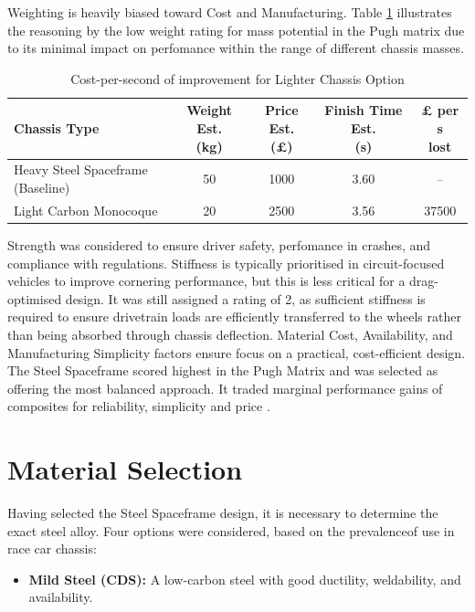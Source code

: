 \documentclass[11pt, a4paper]{report}
\numberwithin{equation}{section}
\begin{document}
\begin{refsection}
Weighting is heavily biased toward Cost and Manufacturing. Table \ref{tab:chassis_cost_performance} illustrates the reasoning by the low weight rating for mass potential in the Pugh matrix due to its minimal impact on perfomance within the range of different chassis masses.

\begin{table}[h]
\centering
\caption{Cost-per-second of improvement for Lighter Chassis Option}
\label{tab:chassis_cost_performance}
\begin{tabular}{|l|c|c|c|c|}
\hline
\textbf{Chassis Type} & \makecell{\textbf{Weight Est.} \\ \textbf{(kg)}} & \makecell{\textbf{Price Est.} \\ \textbf{(£)}} & \makecell{\textbf{Finish Time Est.} \\ \textbf{(s)}} & \makecell{\textbf{£ per s} \\ \textbf{lost}} \\
\hline
Heavy Steel Spaceframe (Baseline) & 50 & 1000 & 3.60 & -- \\
Light Carbon Monocoque & 20 & 2500 & 3.56 & 37500 \\
\hline
\end{tabular}
\end{table}

Strength was considered to ensure driver safety, perfomance in crashes, and compliance with regulations. Stiffness is typically prioritised in circuit-focused vehicles to improve cornering performance, but this is less critical for a drag-optimised design. It was still assigned a rating of 2, as sufficient stiffness is required to ensure drivetrain loads are efficiently transferred to the wheels rather than being absorbed through chassis deflection. Material Cost, Availability, and Manufacturing Simplicity factors ensure focus on a practical, cost-efficient design. The Steel Spaceframe scored highest in the Pugh Matrix and was selected as offering the most balanced approach. It traded marginal performance gains of composites for reliability, simplicity and price \cite{racecar_engineering_oxford_brookes} \cite{tutf_composite_build}.

\section{Material Selection}

Having selected the Steel Spaceframe design, it is necessary to determine the exact steel alloy. Four options were considered, based on the prevalenceof use in race car chassis: 
\begin{itemize}
    \item \textbf{Mild Steel (CDS):} A low-carbon steel with good ductility, weldability, 
    and availability.


\end{itemize}
\end{refsection}
\end{document}
